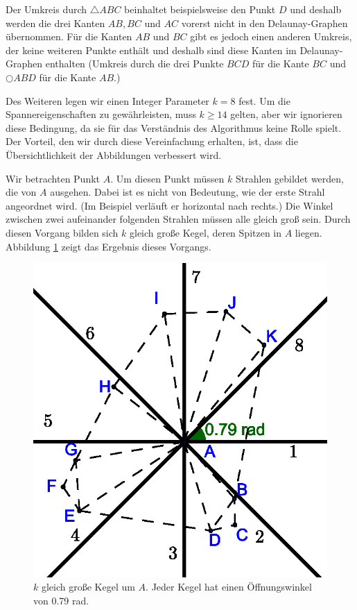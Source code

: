 \documentclass[a4paper,twoside]{IEEEtran}
\begin{document}
Der Umkreis durch $\triangle{ABC} $ beinhaltet beispielsweise den Punkt $D $ und deshalb werden die drei Kanten $AB, BC $ und $AC $ vorerst nicht in den Delaunay-Graphen übernommen.
Für die Kanten $AB $ und $BC $ gibt es jedoch einen anderen Umkreis, der keine weiteren Punkte enthält und deshalb sind diese Kanten im Delaunay-Graphen enthalten (Umkreis durch die drei Punkte $BCD $ für die Kante $BC $ und  $\bigcirc{ABD} $ für die Kante $AB $.)

Des Weiteren legen wir einen Integer Parameter $k=8 $ fest.
Um die Spannereigenschaften zu gewährleisten, muss $k \geq 14 $ gelten, aber wir ignorieren diese Bedingung, da sie für das Verständnis des Algorithmus keine Rolle spielt.
Der Vorteil, den wir durch diese Vereinfachung erhalten, ist, dass die Übersichtlichkeit der Abbildungen verbessert wird.

Wir betrachten Punkt $A $.
Um diesen Punkt müssen $k $ Strahlen gebildet werden, die von $A $ ausgehen.
Dabei ist es nicht von Bedeutung, wie der erste Strahl angeordnet wird. (Im Beispiel verläuft er horizontal nach rechts.)
Die Winkel zwischen zwei aufeinander folgenden Strahlen müssen alle gleich groß sein.
Durch diesen Vorgang bilden sich $k $ gleich große Kegel, deren Spitzen in $A $ liegen.
Abbildung \ref{fig:cones} zeigt das Ergebnis dieses Vorgangs.

\begin{figure}[h!]
\centering
\includegraphics[width=0.7\linewidth]{cones.eps}
\caption{$k $ gleich große Kegel um $A $. Jeder Kegel hat einen Öffnungswinkel von 0.79 rad.}
\label{fig:cones}
\end{figure}
\end{document}
